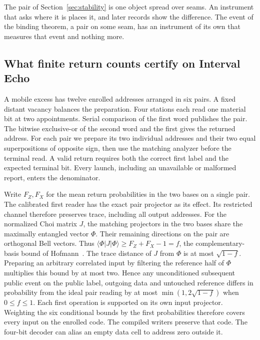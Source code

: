 \documentclass[11pt]{article}
\theoremstyle{definition}
\theoremstyle{remark}
\theoremstyle{plain}
\begin{document}
The pair of Section~\ref{sec:stability} is one object spread over seams.
An instrument that asks where it is places it, and later records show the
difference. The event of the binding theorem, a pair on some seam, has an
instrument of its own that measures that event and nothing more.


\subsection{What finite return counts certify on Interval Echo}
\label{sec:four-return-readings}

A mobile excess has twelve enrolled addresses arranged in six pairs.
A fixed distant vacancy balances the preparation. Four stations each
read one material bit at two appointments. Serial comparison of the first
word publishes the pair. The bitwise exclusive-or of the second word and
the first gives the returned address. For each pair we prepare its two individual
addresses and their two equal superpositions of opposite sign, then use
the matching analyzer before the terminal read. A valid return requires
both the correct first label and the expected terminal bit. Every launch,
including an unavailable or malformed report, enters the denominator.

Write $F_Z,F_X$ for the mean return probabilities in the two bases on a
single pair. The calibrated first reader has the exact pair projector as
its effect. Its restricted channel therefore preserves trace, including
all output addresses. For the normalized Choi matrix $J$, the matching
projectors in the two bases share the maximally entangled vector $\Phi$.
Their remaining directions on the pair are orthogonal Bell vectors.
Thus $\langle\Phi|J|\Phi\rangle\geq F_Z+F_X-1=f$, the
complementary-basis bound of Hofmann~\cite{hofmannreturns}. The trace
distance of $J$ from $\Phi$ is at most $\sqrt{1-f}$. Preparing an
arbitrary correlated input by filtering the reference half of $\Phi$
multiplies this bound by at most two. Hence any unconditioned subsequent public event on the public label,
outgoing data and untouched reference
differs in probability from the ideal pair reading by at most
$\min(1,2\sqrt{1-f})$ when $0\leq f\leq1$. Each first operation is
supported on its own input projector. Weighting the six conditional
bounds by the first probabilities therefore covers every input on the
enrolled code. The compiled writers preserve that code. The four-bit
decoder can alias an empty data cell to address zero outside it.
\end{document}
